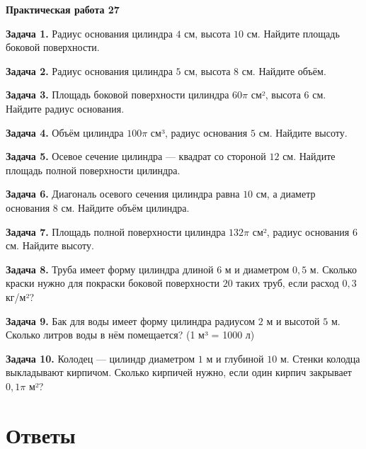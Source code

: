 \documentclass{umk-matematika}
\begin{document}
\begin{center}
{\Large\bfseries Практическая работа 27}
\end{center}
\vspace{0.5cm}

\textbf{Задача 1.} Радиус основания цилиндра $4$ см, высота $10$ см. Найдите площадь боковой поверхности.\par\vspace{10pt}
\textbf{Задача 2.} Радиус основания цилиндра $5$ см, высота $8$ см. Найдите объём.\par\vspace{10pt}
\textbf{Задача 3.} Площадь боковой поверхности цилиндра $60\pi$ см², высота $6$ см. Найдите радиус основания.\par\vspace{10pt}
\textbf{Задача 4.} Объём цилиндра $100\pi$ см³, радиус основания $5$ см. Найдите высоту.\par\vspace{10pt}
\textbf{Задача 5.} Осевое сечение цилиндра — квадрат со стороной $12$ см. Найдите площадь полной поверхности цилиндра.\par\vspace{10pt}
\textbf{Задача 6.} Диагональ осевого сечения цилиндра равна $10$ см, а диаметр основания $8$ см. Найдите объём цилиндра.\par\vspace{10pt}
\textbf{Задача 7.} Площадь полной поверхности цилиндра $132\pi$ см², радиус основания $6$ см. Найдите высоту.\par\vspace{10pt}
\textbf{Задача 8.} Труба имеет форму цилиндра длиной $6$ м и диаметром $0{,}5$ м. Сколько краски нужно для покраски боковой поверхности $20$ таких труб, если расход $0{,}3$ кг/м²?\par\vspace{10pt}
\textbf{Задача 9.} Бак для воды имеет форму цилиндра радиусом $2$ м и высотой $5$ м. Сколько литров воды в нём помещается? (1 м³ = 1000 л)\par\vspace{10pt}
\textbf{Задача 10.} Колодец — цилиндр диаметром $1$ м и глубиной $10$ м. Стенки колодца выкладывают кирпичом. Сколько кирпичей нужно, если один кирпич закрывает $0{,}1\pi$ м²?\par\vspace{10pt}
\newpage
\section*{Ответы}
\end{document}
